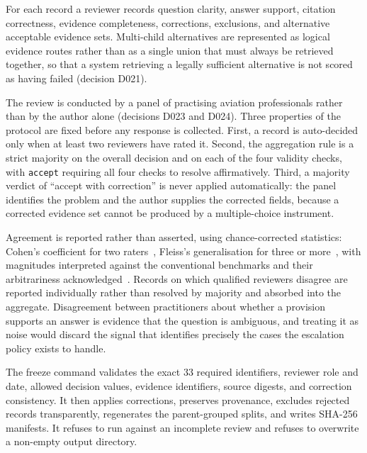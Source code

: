 For each record a reviewer records question clarity, answer support, citation correctness, evidence completeness, corrections, exclusions, and alternative acceptable evidence sets. Multi-child alternatives are represented as logical evidence routes rather than as a single union that must always be retrieved together, so that a system retrieving a legally sufficient alternative is not scored as having failed (decision D021).

The review is conducted by a panel of practising aviation professionals rather than by the author alone (decisions D023 and D024). Three properties of the protocol are fixed before any response is collected. First, a record is auto-decided only when at least two reviewers have rated it. Second, the aggregation rule is a strict majority on the overall decision and on each of the four validity checks, with \texttt{accept} requiring all four checks to resolve affirmatively. Third, a majority verdict of ``accept with correction'' is never applied automatically: the panel identifies the problem and the author supplies the corrected fields, because a corrected evidence set cannot be produced by a multiple-choice instrument.

Agreement is reported rather than asserted, using chance-corrected statistics: Cohen's coefficient for two raters~\cite{cohen1960coefficient}, Fleiss's generalisation for three or more~\cite{fleiss1971measuring}, with magnitudes interpreted against the conventional benchmarks and their arbitrariness acknowledged~\cite{landis1977measurement}. Records on which qualified reviewers disagree are reported individually rather than resolved by majority and absorbed into the aggregate. Disagreement between practitioners about whether a provision supports an answer is evidence that the question is ambiguous, and treating it as noise would discard the signal that identifies precisely the cases the escalation policy exists to handle.

The freeze command validates the exact 33 required identifiers, reviewer role and date, allowed decision values, evidence identifiers, source digests, and correction consistency. It then applies corrections, preserves provenance, excludes rejected records transparently, regenerates the parent-grouped splits, and writes SHA-256 manifests. It refuses to run against an incomplete review and refuses to overwrite a non-empty output directory.


